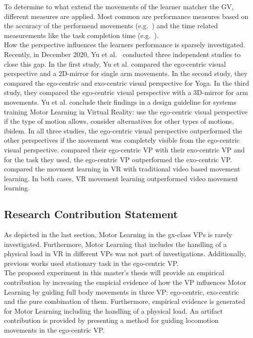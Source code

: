 To determine to what extend the movements of the learner matcher the GV, different measures are applied. Most common are performance measures based on the accuracy of the performend movements (e.g.~\cite{YouMove,thaichichua,vrdancetrainer,onebody,lightguide,physioathome}) and the time related measurements like the task completion time (e.g.~\cite{lightguide,onebody}).\\
How the perspective influences the learners performance is sparsely investigated. Recently, in December 2020, Yu et al.~\cite{perspectivematters} conducted three independent studies to close this gap. In the first study, Yu et al. compared the ego-centric visual perspective and a 2D-mirror for single arm movements. In the second study, they compared the ego-centric and exo-centric visual perspective for Yoga. In the third study, they compared the ego-centric visual perspective with a 3D-mirror for arm movements. Yu et al. conclude their findings in a design guideline for systems training Motor Learning in Virtual Reality: use the ego-centric visual perspective if the type of motion allows, consider alternatives for other types of motions, ibidem. In all three studies, the ego-centric visual perspective outperformed the other perspectives if the movement was completely visible from the ego-centric visual perspective. \cite{onebody,lightguide} compared their ego-centric VP with their exo-centric VP and for the task they used, the ego-centric VP outperformed the exo-centric VP. \cite{YouMove,vrdancetrainer} compared the movment learning in VR with traditional video based movement learning. In both cases, VR movement learning outperformed video movement learning.\\

\subsection{Research Contribution Statement}
\label{sec:delimination_contribution}
As depicted in the last section, Motor Learning in the gx-class VPs is rarely investigated. Furthermore, Motor Learning that includes the handling of a physical load in VR in different VPs was not part of investigations. Additionally, previous works used stationary task in the ego-centric VP.\\
The proposed experiment in this master's thesis will provide an empirical contribution by increasing the empicial evidence of how the VP influences Motor Learning by guiding full body movements in three VP: ego-centric, exo-centric and the pure combination of them. Furthermore, empirical evidence is generated for Motor Learning including the handling of a physical load. An artifact contribution is provided by presenting a method for guiding locomotion movements in the ego-centric VP.\\

